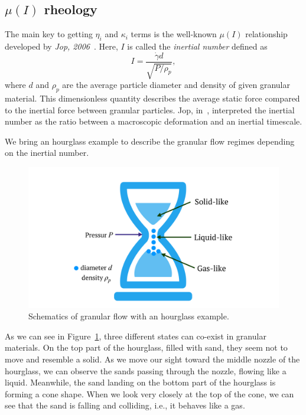 \subsection{$\mu (I)$ rheology}
The main key to getting $\eta_i$ and $\kappa_i$ terms is the well-known $\mu(I)$ relationship developed by \textit{Jop, 2006}~\cite{jop_constitutive_2006}.
Here, $I$ is called the \textit{inertial number} defined as 
\begin{equation}
  I =  \frac{\dot{\gamma} d }{\sqrt{P/\rho_p}},
  \label{eq_inertialI}
\end{equation}
where $d$ and $\rho_p$ are the average particle diameter and density of given granular material.
This dimensionless quantity describes the average static force compared to the inertial force between granular particles. Jop, in~\cite{jop_constitutive_2006}, interpreted the inertial number as the ratio between a macroscopic deformation and an inertial timescale. 
\par
We bring an hourglass example to describe the granular flow regimes depending on the inertial number. 
\begin{figure}[ht]
  \begin{center}
    \includegraphics[scale=0.15]{figures/fig_hourglass.pdf}
    \end{center}
  \caption{Schematics of granular flow with an hourglass example.}
  \label{fig_hourglass}
\end{figure}
As we can see in Figure~\ref{fig_hourglass}, three different states can co-exist in granular materials. 
On the top part of the hourglass, filled with sand, they seem not to move and resemble a solid. 
As we move our sight toward the middle nozzle of the hourglass, we can observe the sands passing through the nozzle, flowing like a liquid.
Meanwhile, the sand landing on the bottom part of the hourglass is forming a cone shape. When we look very closely at the top of the cone, we can see that the sand is falling and colliding, i.e., it behaves like a gas.
